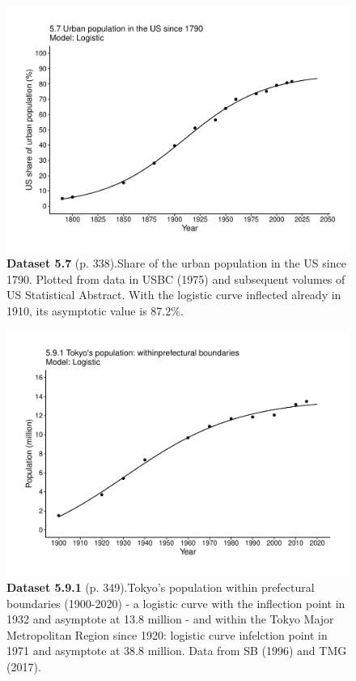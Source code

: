 \documentclass[aps,rmp,preprint,superscriptaddress,10pt,onecolumn]{article}
\begin{document}
\clearpage
\begin{figure}[h]
\includegraphics[width=\textwidth]{output/figs-ggplot/5.7.pdf}
\caption*{\textbf{Dataset 5.7} (p. 338).Share of the urban population in the US since 1790. Plotted from data in USBC (1975) and subsequent volumes of US Statistical Abstract. With the logistic curve inflected already in 1910, its asymptotic value is 87.2\%.}
\end{figure}
	
\clearpage
\begin{figure}[h]
\includegraphics[width=\textwidth]{output/figs-ggplot/5.9.1.pdf}
\caption*{\textbf{Dataset 5.9.1} (p. 349).Tokyo's population within prefectural boundaries (1900-2020) - a logistic curve with the inflection point in 1932 and asymptote at 13.8 million - and within the Tokyo Major Metropolitan Region since 1920: logistic curve infelction point in 1971 and asymptote at 38.8 million. Data from SB (1996) and TMG (2017). }
\end{figure}
	
\end{document}
